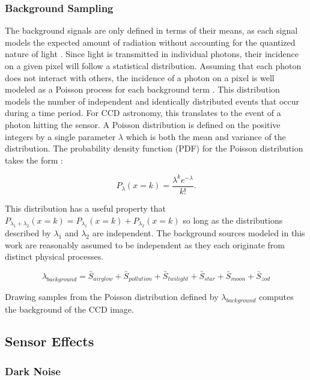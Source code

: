 \subsubsection{Background Sampling}

The background signals are only defined in terms of their means, as each signal models the expected amount of radiation without accounting for the quantized nature of light \cite{krag2003}. Since light is transmitted in individual photons, their incidence on a given pixel will follow a statistical distribution. Assuming that each photon does not interact with others, the incidence of a photon on a pixel is well modeled as a Poisson process for each background term \cite{frueh2019notes}. This distribution models the number of independent and identically distributed events that occur during a time period. For CCD astronomy, this translates to the event of a photon hitting the sensor. A Poisson distribution is defined on the positive integers by a single parameter $\lambda$ which is both the mean and variance of the distribution. The probability density function (PDF) for the Poisson distribution takes the form \cite{frueh2019notes}:

\begin{equation} \label{eq:poisson_pdf}
  P_\lambda(x=k) = \frac{\lambda^k e^{-\lambda}}{k!}.
\end{equation}

This distribution has a useful property that $P_{\lambda_1 + \lambda_2}(x=k) = P_{\lambda_1}(x=k) + P_{\lambda_2}(x=k)$ so long as the distributions described by $\lambda_1$ and $\lambda_2$ are independent. The background sources modeled in this work are reasonably assumed to be independent as they each originate from distinct physical processes.

\begin{equation} \label{eq:background_poisson}
  \lambda_{background} = \bar{S}_{airglow} + \bar{S}_{pollution} + \bar{S}_{twilight} + \bar{S}_{star} + \bar{S}_{moon} + \bar{S}_{zod}
\end{equation}

Drawing samples from the Poisson distribution defined by $\lambda_{background}$ computes the background of the CCD image. 

\subsection{Sensor Effects}

\subsubsection{Dark Noise}

